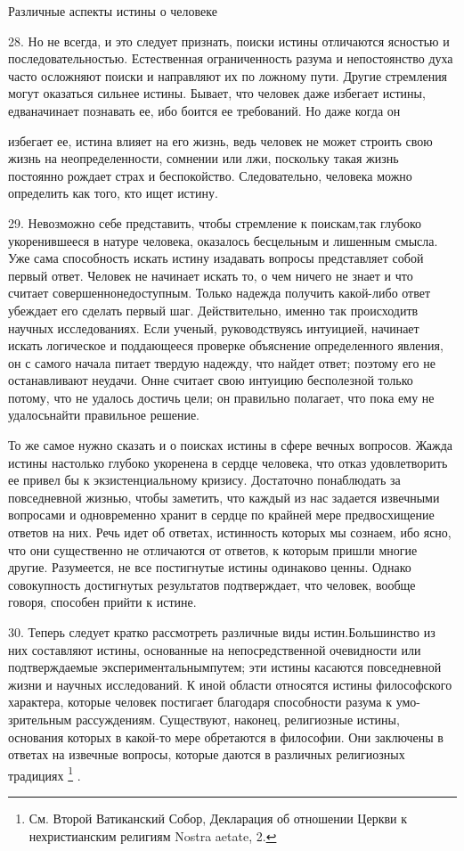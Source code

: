 \documentclass[a5paper,10pt]{article}
\begin{document}
Различные аспекты истины о человеке

28. Но не всегда, и это следует признать, поиски истины отличаются ясностью и
последовательностью. Естественная ограниченность разума и непостоянство духа
часто осложняют поиски и направляют их по ложному пути. Другие стремления могут
оказаться сильнее истины. Бывает, что человек даже избегает истины,
едваначинает познавать ее, ибо боится ее требований. Но даже когда он

избегает ее, истина влияет на его жизнь, ведь человек не может строить свою
жизнь на неопределенности, сомнении или лжи, поскольку такая жизнь постоянно
рождает страх и беспокойство. Следовательно, человека можно определить как
того, кто ищет истину.

29. Невозможно себе представить, чтобы стремление к поискам,так глубоко
укоренившееся в натуре человека, оказалось бесцельным и лишенным смысла. Уже
сама способность искать истину изадавать вопросы представляет собой первый
ответ. Человек не начинает искать то, о чем ничего не знает и что считает
совершеннонедоступным. Только надежда получить какой-либо ответ убеждает его
сделать первый шаг. Действительно, именно так происходитв научных
исследованиях. Если ученый, руководствуясь интуицией, начинает искать
логическое и поддающееся проверке объяснение определенного явления, он с самого
начала питает твердую надежду, что найдет ответ; поэтому его не останавливают
неудачи. Онне считает свою интуицию бесполезной только потому, что не удалось
достичь цели; он правильно полагает, что пока ему не удалосьнайти правильное
решение.

То же самое нужно сказать и о поисках истины в сфере вечных вопросов. Жажда
истины настолько глубоко укоренена в сердце человека, что отказ удовлетворить
ее привел бы к экзистенциальному кризису. Достаточно понаблюдать за
повседневной жизнью, чтобы заметить, что каждый из нас задается извечными
вопросами и одновременно хранит в сердце по крайней мере предвосхищение ответов
на них. Речь идет об ответах, истинность которых мы сознаем, ибо ясно, что они
существенно не отличаются от ответов, к которым пришли многие другие.
Разумеется, не все постигнутые истины одинаково ценны. Однако совокупность
достигнутых результатов подтверждает, что человек, вообще говоря, способен
прийти к истине.

30. Теперь следует кратко рассмотреть различные виды истин.Большинство из них
составляют истины, основанные на непосредственной очевидности или
подтверждаемые экспериментальнымпутем; эти истины касаются повседневной жизни и
научных исследований. К иной области относятся истины философского характера,
которые человек постигает благодаря способности разума к умо-зрительным
рассуждениям. Существуют, наконец, религиозные истины, основания которых в
какой-то мере обретаются в философии. Они заключены в ответах на извечные
вопросы, которые даются в различных религиозных традициях \footnote{См. Второй
Ватиканский Собор, Декларация об отношении Церкви к нехристианским религиям
Nostra aetate, 2.}  .
\end{document}
